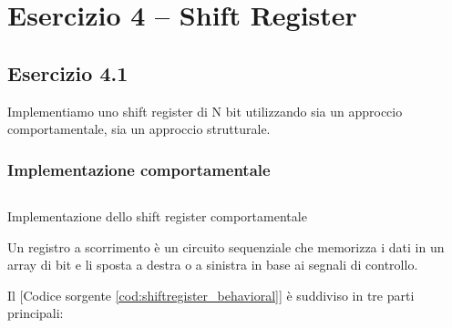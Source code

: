 \section{Esercizio 4 -- Shift Register}
\subsection{Esercizio 4.1}
Implementiamo uno shift register di N bit utilizzando sia un approccio comportamentale, sia un approccio strutturale.

\subsubsection{Implementazione comportamentale}
\begin{code}
    \inputminted{vhdl}{vhdl/shiftregister_behavioral.vhd}
    \caption{Implementazione dello shift register comportamentale}
    \label{cod:shiftregister_behavioral}
\end{code}

Un registro a scorrimento è un circuito sequenziale che memorizza i dati in un array di bit e li sposta a destra o a sinistra in base ai segnali di controllo.

Il [Codice sorgente \ref{cod:shiftregister_behavioral}] è suddiviso in tre parti principali:

